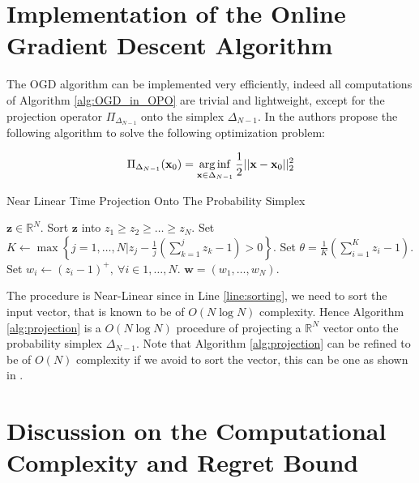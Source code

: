 \section{Implementation of the Online Gradient Descent Algorithm}\label{sec:implementation}

The OGD algorithm can be implemented very efficiently, indeed all computations of Algorithm \ref{alg:OGD_in_OPO} are trivial and lightweight, except for the projection operator $\Pi_{\Delta_{N-1}}$ onto the simplex $\Delta_{N-1}$. In \cite{duchi2008efficient} the authors propose the following algorithm to solve the following optimization problem:

\begin{equation}
\Pi_{\Delta_{N-1}}(\mathbf x_0)=\operatorname*{arg\,inf}\limits_{\mathbf x\in\Delta_{N-1}}\frac{1}{2}||\mathbf x-\mathbf x_0||_2^2
\end{equation}


\begin{algorithm}
    \caption{Near Linear Time Projection Onto The Probability Simplex}
    \label{alg:projection}
    \begin{algorithmic}[1]
    \REQUIRE $\mathbf{z}\in\mathbb R^N.$ \nonumber
    \STATE Sort $\mathbf z$ into $z_1\ge z_2\ge \ldots \ge z_N.$ \label{line:sorting}
    \STATE Set $K\gets\max\left\{j=1,\ldots,N\biggr\rvert z_j-\frac{1}{j}\left(\sum\limits_{k=1}^jz_k-1\right)>0\right\}.$
    \STATE Set $\theta=\frac{1}{K}\left(\sum\limits_{i=1}^Kz_i-1\right).$
    \STATE Set $w_i\gets(z_i-1)^+, \ \forall i\in1,\ldots,N$.
    \RETURN $\mathbf w=(w_1,\ldots,w_N).$
    \end{algorithmic}
\end{algorithm}

The procedure is Near-Linear since in Line \ref{line:sorting}, we need to sort the input vector, that is known to be of $O(N\log N)$ complexity. Hence Algorithm \ref{alg:projection} is a $O(N\log N)$ procedure of projecting a $\mathbb R^N$ vector onto the probability simplex $\Delta_{N-1}$. Note that Algorithm \ref{alg:projection} can be refined to be of $O(N)$ complexity if we avoid to sort the vector, this can be one as shown in \cite{duchi2008efficient}.

\section{Discussion on the Computational Complexity and Regret Bound}


